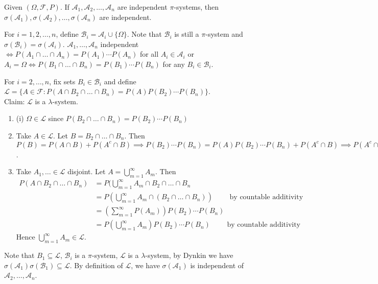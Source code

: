 \documentclass[class=article,crop=false]{standalone}
\begin{document}
\begin{thm}[4.2]
	Given $ (\Omega,\mathcal{F},P)$. If $ \mathcal{A}_1,\mathcal{A}_2,\ldots,\mathcal{A}_n$ are independent $\pi$-systems, then $ \sigma(\mathcal{A}_1), \sigma(\mathcal{A}_2), \ldots, \sigma(\mathcal{A}_n)$ are independent.
\end{thm}

\begin{prf}
	For $ i=1,2,\ldots,n$, define $ \mathcal{B}_i = \mathcal{A}_i \cup \{\Omega\} $. Note that $ \mathcal{B}_i$ is still a $\pi$-system and $ \sigma(\mathcal{B}_i) = \sigma(\mathcal{A}_i)$. $ \mathcal{A}_1,\ldots,\mathcal{A}_n$ independent $ \iff P(A_1 \cap \ldots \cap A_n) = P(A_1)\cdots P(A_n)$ for all $ A_i \in \mathcal{A}_i$ or $ A_i=\Omega \iff P(B_1 \cap \ldots \cap B_n) = P(B_1)\cdots P(B_n)$ for any $ B_i \in \mathcal{B}_i$.

	For $ i=2,\ldots , n$, fix sets $ B_i \in \mathcal{B}_i$ and define $ \mathcal{L} = \{A \in \mathcal{F}: P(A \cap B_2 \cap \ldots \cap B_n) = P(A) P(B_2) \cdots P(B_n)\} $.\\

	Claim: $ \mathcal{L}$ is a $\lambda$-system.
	\begin{enumerate}[label=(\roman*)]
		\item (i) $ \Omega \in \mathcal{L}$ since $ P(B_2 \cap \ldots \cap  B_n) = P(B_2)\cdots P(B_n)$
		\item Take $ A \in \mathcal{L}$. Let $ B = B_2 \cap  \ldots \cap  B_n$. Then $ P(B)=P(A \cap B) + P(A^{c} \cap B) \implies P(B_2) \cdots P(B_n)=P(A)P(B_2)\cdots P(B_n)+P(A^{c} \cap B) \implies P(A^{c} \cap B) = (1-P(A)P(B_2)\cdots P(B_n) \implies A^{c} \in \mathcal{L}$.
		\item Take $ A_1,\ldots \in \mathcal{L}$ disjoint. Let $ A=\bigcup_{ m =1}^{\infty} A_m$. Then
			\begin{align*}
				P(A \cap  B_2 \cap  \ldots \cap B_n) &= P(\bigcup_{ m =1}^{\infty} A_m \cap B_2 \cap \ldots \cap B_n  \\
								     &= P\left( \bigcup_{ m =1}^{\infty} A_m \cap (B_2 \cap \ldots \cap B_n) \right) \qquad \text{ by countable additivity}  \\
								     &= \left( \sum_{ m= 1}^{\infty} P(A_m) \right) P(B_2) \cdots P(B_n) \\
								     &= P\left( \bigcup_{ m =1}^{\infty} A_m \right) P(B_2) \cdots P(B_n) \qquad \text{ by countable additivity} 
			\end{align*}
			Hence $ \bigcup_{ m =1}^{\infty} A_m \in \mathcal{L}$.
	\end{enumerate}

	Note that $ B_1 \subseteq \mathcal{L}$, $ \mathcal{B}_i$ is a $\pi$-system, $ \mathcal{L}$ is a $\lambda$-system, by Dynkin we have $ \sigma(\mathcal{A}_1) \sigma(\mathcal{B}_1) \subseteq \mathcal{L}$. By definition of $ \mathcal{L}$, we have $ \sigma(\mathcal{A}_1)$ is independent of $ \mathcal{A}_2,\ldots,\mathcal{A}_n$.
\end{prf}
\end{document}
